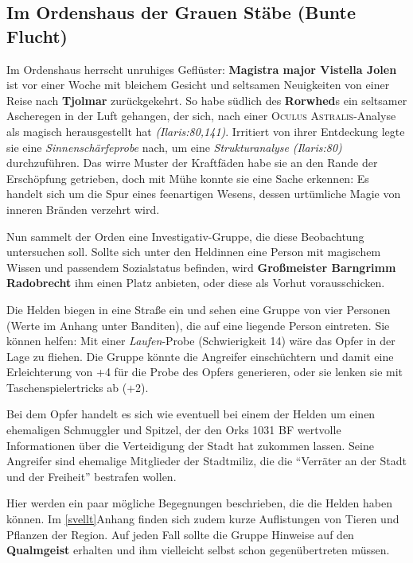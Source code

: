 \subsection[Im Ordenshaus der grauen Stäbe]{Im Ordenshaus der Grauen Stäbe (Bunte Flucht)}
Im Ordenshaus herrscht unruhiges Geflüster: \textbf{Magistra major Vistella Jolen} ist vor einer Woche mit bleichem Gesicht und seltsamen Neuigkeiten von einer Reise nach \textbf{Tjolmar} zurückgekehrt. So habe südlich des \textbf{Rorwhed}s ein seltsamer Ascheregen in der Luft gehangen, der sich, nach einer \textsc{Oculus Astralis}-Analyse als magisch herausgestellt hat \emph{(Ilaris:80,141)}.
Irritiert von ihrer Entdeckung legte sie eine \emph{Sinnenschärfeprobe} nach, um eine \emph{Strukturanalyse} \emph{(Ilaris:80)} durchzuführen. Das wirre Muster der Kraftfäden habe sie an den Rande der Erschöpfung getrieben, doch mit Mühe konnte sie eine Sache erkennen: Es handelt sich um die Spur eines feenartigen Wesens, dessen urtümliche Magie von inneren Bränden verzehrt wird.

Nun sammelt der Orden eine Investigativ-Gruppe, die diese Beobachtung untersuchen soll.
Sollte sich unter den Heldinnen eine Person mit magischem Wissen und passendem Sozialstatus befinden, wird \textbf{Großmeister Barngrimm Radobrecht} ihm einen Platz anbieten, oder diese als Vorhut vorausschicken.


Die Helden biegen in eine Straße ein und sehen eine Gruppe von vier Personen (Werte im Anhang unter Banditen), die auf eine liegende Person eintreten.
Sie können helfen: Mit einer \emph{Laufen}-Probe (Schwierigkeit 14) wäre das Opfer in der Lage zu fliehen. Die Gruppe könnte die Angreifer einschüchtern und damit eine Erleichterung von +4 für die Probe des Opfers generieren, oder sie lenken sie mit Taschenspielertricks ab (+2).

Bei dem Opfer handelt es sich wie eventuell bei einem der Helden um einen ehemaligen Schmuggler und Spitzel, der den Orks 1031 BF wertvolle Informationen über die Verteidigung der Stadt hat zukommen lassen. Seine Angreifer sind ehemalige Mitglieder der Stadtmiliz, die die \enquote{Verräter an der Stadt und der Freiheit} bestrafen wollen.

\newpage

Hier werden ein paar mögliche Begegnungen beschrieben, die die Helden haben können. Im \ref{svellt}{Anhang} finden sich zudem kurze Auflistungen von Tieren und Pflanzen der Region. Auf jeden Fall sollte die Gruppe Hinweise auf den \textbf{Qualmgeist} erhalten und ihm vielleicht selbst schon gegenübertreten müssen.


